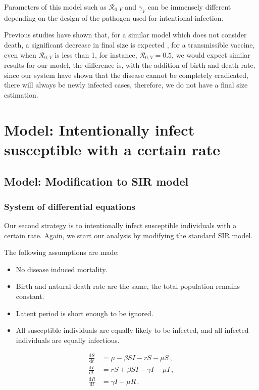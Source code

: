 \documentclass[12pt]{article}
\newcommand\dbyd[2]{\frac{\mathrm d{#1}}{\mathrm d{#2}}}
\newcommand{\R}{\mathcal{R}}
\begin{document}
Parameters of this model such as $\R_{0,V}$ and $\gamma_V$ can be immensely different depending on the design of the pathogen used for intentional infection. 

Previous studies have shown that, for a similar model which does not consider death, a significant decrease in final size is expected \cite{nuismer2018controlling}, for a transmissible vaccine, even when $\R_{0,V}$ is less than 1, for instance,  $\R_{0,V}=0.5$, we would expect similar results for our model, the difference is, with the addition of birth and death rate, since our system have shown that the disease cannot be completely eradicated, there will always be newly infected cases, therefore, we do not have a final size estimation. 

\section{Model: Intentionally infect susceptible with a certain rate}
\subsection{Model: Modification to SIR model}
\subsubsection{System of differential equations}
Our second strategy is to intentionally infect susceptible individuals with a certain rate. Again, we start our analysis by modifying the standard SIR model.

The following assumptions are made:
\begin{itemize}
\item No disease induced mortality.
\item Birth and natural death rate are the same, the total population remains constant.
\item Latent period is short enough to be ignored.
\item All susceptible individuals are equally likely to be infected, and all infected individuals are equally infectious.
\end{itemize}

\begin{linenomath*}
\begin{equation}\label{model:susceptible}
\begin{split}
\dbyd{S}{t}&=\mu- \beta SI-rS-\mu S\,, \\
\dbyd{I}{t}&=rS+\beta SI-\gamma I -\mu I\,,\\
\dbyd{R}{t}&=\gamma I-\mu R\,.
\end{split}
\end{equation}
\end{linenomath*}
\end{document}

